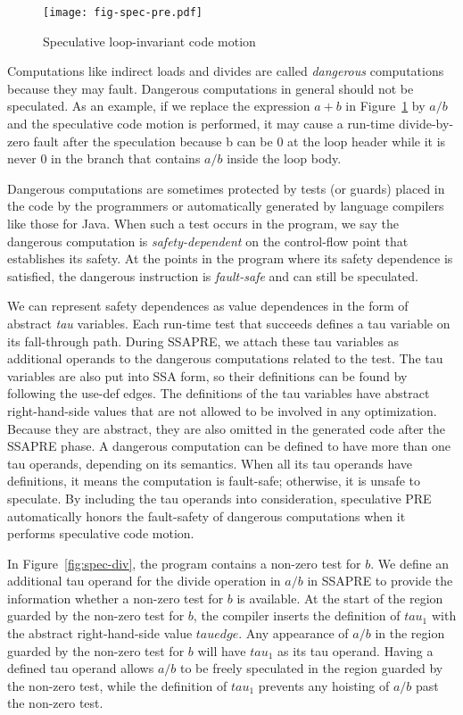 \begin{figure}
\centering
\texttt{[image: fig-spec-pre.pdf]}
\caption{Speculative loop-invariant code motion}
\label{fig:spec-pre}
\end{figure}

Computations like indirect loads and divides are called \emph{dangerous}
computations because they may fault.  Dangerous computations in general should
not be speculated.
As an example, if we replace the expression $a+b$ in Figure~\ref{fig:spec-pre}
by $a/b$ and the speculative code motion is performed, it may cause a run-time
divide-by-zero fault after the speculation because b can be $0$ at the 
loop header while it is never $0$ in the branch that contains $a/b$ inside the 
loop body.

Dangerous computations are sometimes protected by tests (or guards) placed in
the code by the programmers or automatically generated by language compilers
like those for Java.  When such a test occurs in the
program, we say the dangerous computation is \emph{safety-dependent} on
the control-flow point that establishes its safety.  At the points in the 
program where its safety dependence is satisfied, the dangerous instruction
is \emph{fault-safe} and can still be speculated.

We can represent safety dependences as value dependences in the
form of abstract \emph{tau} variables.  Each run-time test
that succeeds defines a tau variable on its fall-through path.  During SSAPRE,
we attach these tau variables as additional operands to the
dangerous computations related to the test.  The tau variables are also 
put into SSA form, so their definitions can
be found by following the use-def edges.  The definitions of the tau variables 
have abstract right-hand-side values that are not allowed to be
involved in any optimization.  Because they are abstract, they
are also omitted in the generated code after the SSAPRE phase.  A dangerous
computation can be defined to have more than one tau operands, depending on
its semantics.  When all its tau operands have definitions, 
it means the computation is fault-safe; otherwise, it is unsafe to speculate.  
By including the tau operands into consideration, speculative PRE automatically
honors the fault-safety of dangerous computations when it performs speculative
code motion.

In Figure~\ref{fig:spec-div}, the program contains a 
non-zero test for $b$.  We define an additional tau operand
for the divide operation in $a/b$ in SSAPRE to
provide the information whether a non-zero test for $b$ is available.  
At the start of the region guarded by the non-zero test for $b$, the compiler
inserts the definition of $tau_1$ with the abstract right-hand-side value 
$tauedge$.  Any appearance of $a/b$ in the region guarded by
the non-zero test for $b$ will have $tau_1$ as its tau operand.  Having a
defined tau operand allows $a/b$ to be freely speculated in the region
guarded by the non-zero test, while the definition of $tau_1$ prevents any
hoisting of $a/b$ past the non-zero test.

